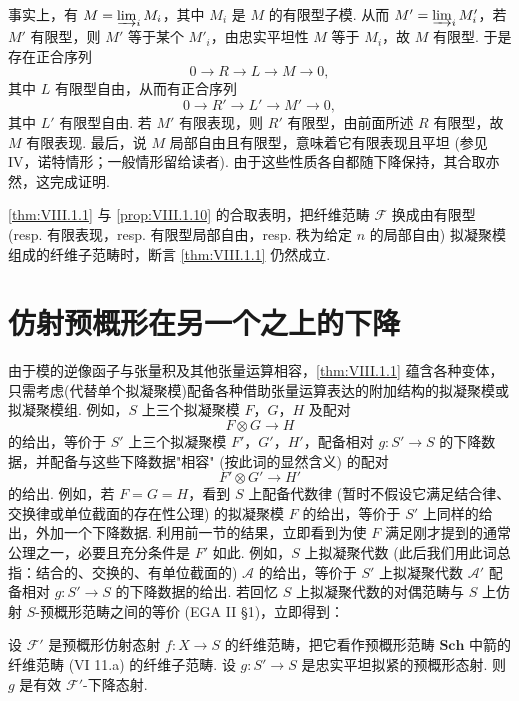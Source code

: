 事实上，有 $M = \varinjlim_i M_i$，其中 $M_i$ 是 $M$ 的有限型子模. 从而 $M' = \varinjlim_i M'_i$，若 $M'$ 有限型，则 $M'$ 等于某个 $M'_i$，由忠实平坦性 $M$ 等于 $M_i$，故 $M$ 有限型. 于是存在正合序列
\[
0 \longrightarrow R \longrightarrow L \longrightarrow M \longrightarrow 0,
\]
其中 $L$ 有限型自由，从而有正合序列
\[
0 \longrightarrow R' \longrightarrow L' \longrightarrow M' \longrightarrow 0,
\]
其中 $L'$ 有限型自由. 若 $M'$ 有限表现，则 $R'$ 有限型，由前面所述 $R$ 有限型，故 $M$ 有限表现. 最后，说 $M$ 局部自由且有限型，意味着它有限表现且平坦 (参见 IV，诺特情形；一般情形留给读者). 由于这些性质各自都随下降保持，其合取亦然，这完成证明.

\begin{remark}\label{rem:VIII.1.12}
\ref{thm:VIII.1.1} 与 \ref{prop:VIII.1.10} 的合取表明，把纤维范畴 $\mathcal{F}$ 换成由有限型 (resp. 有限表现，resp. 有限型局部自由，resp. 秩为给定 $n$ 的局部自由) 拟凝聚模组成的纤维子范畴时，断言 \ref{thm:VIII.1.1} 仍然成立.
\end{remark}

\section{仿射预概形在另一个之上的下降}

由于模的逆像函子与张量积及其他张量运算相容，\cref{thm:VIII.1.1} 蕴含各种变体，只需考虑(代替单个拟凝聚模)配备各种借助张量运算表达的附加结构的拟凝聚模或拟凝聚模组. 例如，$S$ 上三个拟凝聚模 $F$，$G$，$H$ 及配对
\[
F \otimes G \longrightarrow H
\]
的给出，等价于 $S'$ 上三个拟凝聚模 $F'$，$G'$，$H'$，配备相对 $g \colon S' \to S$ 的下降数据，并配备与这些下降数据"相容" (按此词的显然含义) 的配对
\[
F' \otimes G' \longrightarrow H'
\]
的给出. 例如，若 $F = G = H$，看到 $S$ 上配备代数律 (暂时不假设它满足结合律、交换律或单位截面的存在性公理) 的拟凝聚模 $F$ 的给出，等价于 $S'$ 上同样的给出，外加一个下降数据. 利用前一节的结果，立即看到为使 $F$ 满足刚才提到的通常公理之一，必要且充分条件是 $F'$ 如此. 例如，$S$ 上拟凝聚代数 (此后我们用此词总指：结合的、交换的、有单位截面的) $\mathcal{A}$ 的给出，等价于 $S'$ 上拟凝聚代数 $\mathcal{A}'$ 配备相对 $g \colon S' \to S$ 的下降数据的给出. 若回忆 $S$ 上拟凝聚代数的对偶范畴与 $S$ 上仿射 $S$-预概形范畴之间的等价 (EGA II §1)，立即得到：

\begin{theorem}\label{thm:VIII.2.1}
设 $\mathcal{F}'$ 是预概形仿射态射 $f \colon X \to S$ 的纤维范畴，把它看作预概形范畴 $\mathbf{Sch}$ 中箭的纤维范畴 (VI 11.a) 的纤维子范畴. 设 $g \colon S' \to S$ 是忠实平坦拟紧的预概形态射. 则 $g$ 是有效 $\mathcal{F}'$-下降态射.
\end{theorem}

